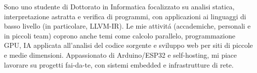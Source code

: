
\begin{cvparagraph}
    Sono uno studente di Dottorato in Informatica focalizzato su analisi statica,
    interpretazione astratta e verifica di programmi, con applicazioni ai
    linguaggi di basso livello (in particolare, LLVM-IR).
    Le mie attivitá (accademiche, personali e in piccoli team) coprono anche 
    temi come calcolo parallelo, programmazione GPU, IA applicata all'analisi
    del codice sorgente e sviluppo web per siti di piccole e medie dimensioni.
    Appassionato di Arduino/ESP32 e self-hosting, mi piace lavorare su
    progetti fai-da-te, con sistemi embedded e infrastrutture di rete.
\end{cvparagraph}

